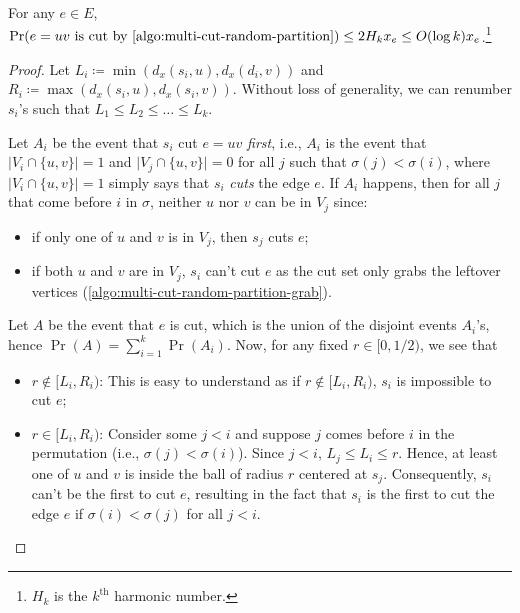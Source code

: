 \begin{lemma}\label{lma:multi-cut-random-partition-probability}
	For any \(e \in E\), \(\Pr(e = uv \text{ is cut by \autoref{algo:multi-cut-random-partition}}) \leq 2 H_k x_e \leq O(\log k) x_e\).\footnote{\(H_k\) is the \(k^{\text{th} }\) harmonic number.}
\end{lemma}
\begin{proof}
	Let \(L_i \coloneqq \min (d_x(s_i, u) , d_x(d_i, v))\) and \(R_i \coloneqq \max (d_x(s_i, u), d_x(s_i, v))\). Without loss of generality, we can renumber \(s_i\)'s such that \(L_1 \leq L_2 \leq \dots \leq L_k\).

	\begin{center}
	\end{center}

	Let \(A_i\) be the event that \(s_i\) cut \(e = uv\) \emph{first}, i.e., \(A_i\) is the event that \(\lvert V_i \cap \{ u, v \} \rvert = 1\) and \(\lvert V_j \cap \{ u, v \} \rvert = 0\) for all \(j\) such that \(\sigma (j) < \sigma (i)\), where \(\lvert V_i \cap \{ u, v \} \rvert = 1\) simply says that \(s_i\) \emph{cuts} the edge \(e\). If \(A_i\) happens, then for all \(j\) that come before \(i\) in \(\sigma \), neither \(u\) nor \(v\) can be in \(V_j\) since:
	\begin{itemize}
		\item if only one of \(u\) and \(v\) is in \(V_j\), then \(s_j\) cuts \(e\);
		\item if both \(u\) and \(v\) are in \(V_j\), \(s_i\) can't cut \(e\) as the cut set only grabs the leftover vertices (\autoref{algo:multi-cut-random-partition-grab}).
	\end{itemize}

	Let \(A\) be the event that \(e\) is cut, which is the union of the disjoint events \(A_i\)'s, hence \(\Pr(A) = \sum_{i=1}^{k} \Pr(A_i)\). Now, for any fixed \(r \in [0, 1 / 2)\), we see that
	\begin{itemize}
		\item \(r \notin [L_i, R_i)\): This is easy to understand as if \(r \notin [L_i, R_i)\), \(s_i\) is impossible to cut \(e\);
		\item \(r \in [L_i, R_i)\): Consider some \(j < i\) and suppose \(j\) comes before \(i\) in the permutation (i.e., \(\sigma (j) <\sigma (i)\)). Since \(j < i\), \(L_j \leq L_i \leq r\). Hence, at least one of \(u\) and \(v\) is inside the ball of radius \(r\) centered at \(s_j\). Consequently, \(s_i\) can't be the first to cut \(e\), resulting in the fact that \(s_i\) is the first to cut the edge \(e\) if \(\sigma (i) < \sigma (j)\) for all \(j < i\).
	\end{itemize}


\end{proof}
